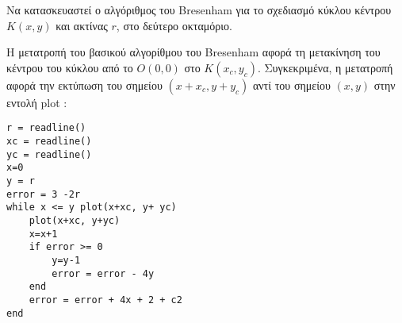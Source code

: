 \begin{exercise}
	Να κατασκευαστεί ο αλγόριθμος του Bresenham για το σχεδιασμό κύκλου κέντρου $Κ(x, y)$ και ακτίνας $r$, στο δεύτερο οκταμόριο.
\end{exercise}

\begin{solution}
	Η μετατροπή του βασικού αλγορίθμου του Bresenham αφορά τη μετακίνηση του κέντρου του κύκλου από το $O(0,0)$ στο $Κ(x_c, y_c)$. Συγκεκριμένα, η μετατροπή αφορά την εκτύπωση του σημείου $(x + x_c,y +y_c)$ αντί του σημείου $(x,y)$ στην εντολή plot :

\begin{lstlisting} 
r = readline() 
xc = readline() 
yc = readline() 
x=0
y = r
error = 3 -2r
while x <= y plot(x+xc, y+ yc)
	plot(x+xc, y+yc)
	x=x+1
	if error >= 0
		y=y-1
		error = error - 4y
	end
	error = error + 4x + 2 + c2
end
\end{lstlisting}		

\end{solution}